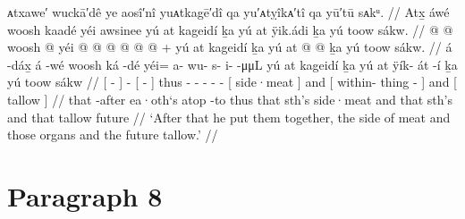 \ex\label{ex:92-148-put-together-meat-organs-tallow}%
%
\begingl
	\glpreamble	ᴀtxawe′ wuckā′dê ye aosî′nî yuᴀtkagē′dî qa yu′ᴀtỵîkᴀ′tî qa yū′tū sᴀkᵘ. //
	\glpreamble	Atx̱ áwé woosh kaadé yéi awsinee yú at kageidí ḵa yú at ÿik.ádi ḵa yú toow sákw. //
	\gla	{}  @ {} {}  @ {}
		{} woosh  @ {} {}
		yéi @  @ {} @ {} @ {} @ {} @ {} +
		{} yú at kageidí {}
		ḵa {} yú at  @ {} @ {} {}
		ḵa {} yú toow sákw. {} //
	\glb	{} á -dáx̱ {} á -wé
		{} woosh ká -dé {}
		yéi= a- wu- s- i-  -μμL
		{} yú at kageidí {}
		ḵa {} yú at ÿík- át -í {}
		ḵa {} yú toow sákw {} //
	\glc	{}[  - {}]  -
		{}[   - {}]
		thus - - - -  -
		{}[   side·meat {}]
		and {}[   within- thing - {}]
		and {}[  tallow  {}] //
	\gld	{} that -after {}  {}
		{} ea·oth‘s atop -to {}
		thus  {} {} {} {} {}
		{} that sth’s side·meat {}
		and {} that sth’s  {} {} {}
		and {} that tallow future {} //
	\glft	‘After that he put them together, the side of meat and those organs and the future tallow.’
		//
\endgl
\xe


\section{Paragraph 8}\label{sec:92-para-8}


